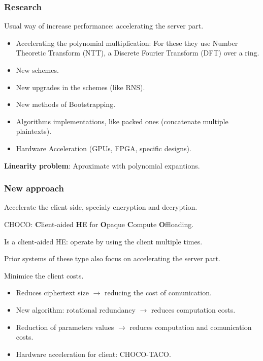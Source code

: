 \documentclass[10pt,handout]{beamer}
\begin{document}
\begin{frame}
\frametitle{Research}

    Usual way of increase performance:  accelerating the server part.
\begin{itemize}\itemsep-0.7em
   \item Accelerating the polynomial multiplication:
    For these they use Number Theoretic Transform (NTT), a Discrete Fourier Transform (DFT) over a ring.
   \item New schemes.
   \item New upgrades in the schemes (like RNS).
   \item New methods of Bootstrapping.
   \item Algorithms implementations, like packed ones (concatenate multiple plaintexts).
   \item Hardware Acceleration (GPUs, FPGA, specific designs).
\end{itemize}

    \textbf{Linearity problem}: Aproximate with polynomial expantions.
\end{frame}


\begin{frame}
\frametitle{New approach}
Accelerate the client side, specialy encryption and decryption.

CHOCO: \textbf{C}lient-aided \textbf{H}E for \textbf{O}paque \textbf{C}ompute \textbf{O}ffloading.

Is a client-aided HE: operate by using the client multiple times.

Prior systems of these type also focus on accelerating the server part.

    Minimice the client costs.
\begin{itemize}\itemsep-0.7em
    \item Reduces ciphertext size $\rightarrow$ reducing the cost of comunication.
    \item New algorithm: rotational redundancy $\rightarrow$ reduces computation costs.
    \item Reduction of parameters values $\rightarrow$ reduces computation and comunication costs.
    \item Hardware acceleration for client: CHOCO-TACO.
\end{itemize}


\end{frame}
\end{document}

